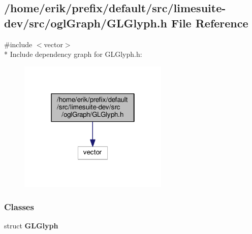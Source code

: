 \subsection{/home/erik/prefix/default/src/limesuite-\/dev/src/ogl\+Graph/\+G\+L\+Glyph.h File Reference}
\label{GLGlyph_8h}
{\ttfamily \#include $<$vector$>$}\\*
Include dependency graph for G\+L\+Glyph.\+h\+:
\nopagebreak
\begin{figure}[H]
\begin{center}
\leavevmode
\includegraphics[width=202pt]{dd/d44/GLGlyph_8h__incl}
\end{center}
\end{figure}
\subsubsection*{Classes}
\begin{DoxyCompactItemize}
\item 
struct {\bf G\+L\+Glyph}
\end{DoxyCompactItemize}
